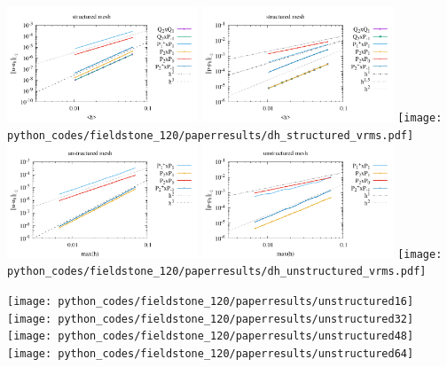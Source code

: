 \begin{center}
\includegraphics[width=5.7cm]{python_codes/fieldstone_120/paperresults/dh_structured_errorsV.pdf}
\includegraphics[width=5.7cm]{python_codes/fieldstone_120/paperresults/dh_structured_errorsP.pdf}
\texttt{[image: python\_codes/fieldstone\_120/paperresults/dh\_structured\_vrms.pdf]}\\
\includegraphics[width=5.7cm]{python_codes/fieldstone_120/paperresults/dh_unstructured_errorsV.pdf}
\includegraphics[width=5.7cm]{python_codes/fieldstone_120/paperresults/dh_unstructured_errorsP.pdf}
\texttt{[image: python\_codes/fieldstone\_120/paperresults/dh\_unstructured\_vrms.pdf]}
\end{center}

\texttt{[image: python\_codes/fieldstone\_120/paperresults/unstructured16]}
\texttt{[image: python\_codes/fieldstone\_120/paperresults/unstructured32]}
\texttt{[image: python\_codes/fieldstone\_120/paperresults/unstructured48]}
\texttt{[image: python\_codes/fieldstone\_120/paperresults/unstructured64]}


\newpage
